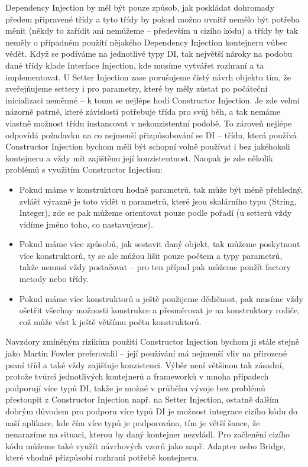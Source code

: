 \documentclass[a4paper,conference]{IEEEtran}
\begin{document}
Dependency Injection by měl být pouze způsob, jak poskládat dohromady předem připravené třídy a tyto třídy by pokud možno uvnitř nemělo být potřeba měnit (někdy to zařídit ani nemůžeme – především u cizího kódu) a třídy by tak neměly o případném použití nějakého Dependency Injection kontejneru vůbec vědět. Když se podíváme na jednotlivé typy DI, tak největší nároky na podobu dané třídy klade Interface Injection, kde musíme vytvářet rozhraní a ta implementovat. U Setter Injection zase porušujeme čistý návrh objektu tím, že zveřejňujeme settery i pro parametry, které by měly zůstat po počáteční inicializaci neměnné – k tomu se nejlépe hodí Constructor Injection. Je zde velmi názorně patrné, které závislosti potřebuje třída pro svůj běh, a tak nemáme vlastně možnost třídu instancovat v nekonzistentní podobě. To zároveň nejlépe odpovídá požadavku na co nejmenší přizpůsobování se DI – třídu, která používá Constructor Injection bychom měli být schopní volně používat i bez jakéhokoli kontejneru a vždy mít zajištěnu její konzistentnost.
Naopak je zde několik problémů s využitím Constructor Injection:
\begin{itemize}
\item Pokud máme v konstruktoru hodně parametrů, tak může být méně přehledný, zvlášť výrazně je toto vidět u parametrů, které jsou skalárního typu (String, Integer), zde se pak můžeme orientovat pouze podle pořadí (u setterů vždy vidíme jméno toho, co nastavujeme).
\item Pokud máme více způsobů, jak sestavit daný objekt, tak můžeme poskytnout více konstruktorů, ty se ale můžou lišit pouze počtem a typy parametrů, takže nemusí vždy postačovat – pro ten případ pak můžeme použít factory metody nebo třídy.
\item Pokud máme více konstruktorů a ještě použijeme dědičnost, pak musíme vždy ošetřit všechny možnosti konstrukce a přesměrovat je na konstruktory rodiče, což může vést k ještě většímu počtu konstruktorů.
\end{itemize}
Navzdory zmíněným rizikům použití Constructor Injection bychom ji stále stejně jako Martin Fowler preferovalil – její používání má nejmenší vliv na přirozené psaní tříd a také vždy zajišťuje konzistenci. Výběr není většinou tak zásadní, protože tvůrci jednotlivých kontejnerů a frameworků v mnoha případech podporují více typů DI, takže je možné v průběhu vývoje bez problémů přestoupit z Constructor Injection např. na Setter Injection, ostatně dalším dobrým důvodem pro podporu více typů DI je možnost integrace cizího kódu do naší aplikace, kde čím více typů je podporováno, tím je větší šance, že nenarazíme na situaci, kterou by daný kontejner nezvládl. Pro začlenění cizího kódu můžeme také využít návrhových vzorů jako např. Adapter nebo Bridge, které vhodně přizpůsobí rozhraní potřebě kontejneru.
\end{document}
